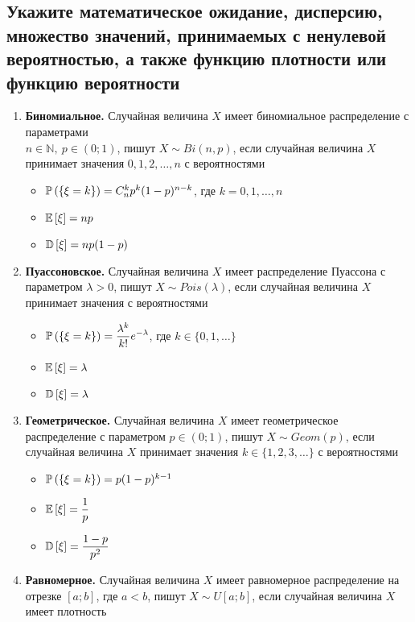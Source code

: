 \documentclass{article}
\begin{document}
\subsection{Укажите математическое ожидание, дисперсию, множество значений, принимаемых с ненулевой вероятностью, а также функцию плотности или функцию вероятности}
\begin{enumerate}
    \item \textbf{Биномиальное.} Случайная величина $X$ имеет биномиальное распределение с параметрами\\ $n\in\mathbb{N},\ p\in(0;1)$, пишут $X\sim Bi(n,p)$, если случайная величина $X$ принимает значения $0,1,2,\ldots,n$ с вероятностями 
    \begin{itemize}
        \item $\mathbb{P}\left(\{\xi=k\}\right)=C_n^k p^k (1-p)^{n-k}$, где $k=0,1,\ldots,n$
        \item $\mathbb{E}\left[\xi\right]=np$
        \item $\mathbb{D}\left[\xi\right]=np(1-p)$
    \end{itemize}
    \item \textbf{Пуассоновское.} Случайная величина $X$ имеет распределение Пуассона с параметром $\lambda>0$, пишут $X\sim Pois(\lambda)$, если случайная величина $X$ принимает значения с вероятностями
    \begin{itemize}
        \item $\mathbb{P}\left(\{\xi=k\}\right)=\displaystyle\frac{\lambda^k}{k!}e^{-\lambda}$, где $k\in\{0,1,\ldots\}$
        \item $\mathbb{E}\left[\xi\right]=\lambda$
        \item $\mathbb{D}\left[\xi\right]=\lambda$
    \end{itemize}
    \item \textbf{Геометрическое.} Случайная величина $X$ имеет геометрическое распределение с параметром $p\in(0;1)$, пишут $X\sim Geom(p)$, если случайная величина $X$ принимает значения $k\in\{1,2,3,\ldots\}$ с вероятностями
    \begin{itemize}
        \item $\mathbb{P}\left(\{\xi=k\}\right)=p(1-p)^{k-1}$
        \item $\mathbb{E}\left[\xi\right]=\displaystyle\frac{1}{p}$
        \item $\mathbb{D}\left[\xi\right]=\displaystyle\frac{1-p}{p^2}$
    \end{itemize}
    \item \textbf{Равномерное.} Случайная величина $X$ имеет равномерное распределение на отрезке $[a;b]$, где $a<b$, пишут $X\sim U[a;b]$, если случайная величина $X$ имеет плотность 

\end{enumerate}
\end{document}
